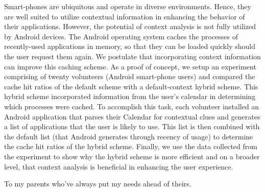 \documentclass[12pt]{uthesis-v12}  %
\begin{document}

\begin{abstractpage}
	Smart-phones are ubiquitous and operate in diverse environments. Hence, they are well suited to utilize contextual information in enhancing the behavior of their applications. However, the potential of context analysis is not fully utilized by Android devices. The Android operating system caches the processes of recently-used applications in memory, so that they can be loaded quickly should the user request them again. We postulate that incorporating context information can improve this caching scheme. As a proof of concept, we setup an experiment comprising of twenty volunteers (Android smart-phone users) and compared the cache hit ratios of the default scheme with a default-context hybrid scheme. This hybrid scheme incorporated information from the user's calendar in determining which processes were cached.  To accomplish this task, each volunteer installed an Android application that parses their Calendar for contextual clues and generates a list of applications that the user is likely to use. This list is then combined with the default list (that Android generates through recency of usage) to determine the cache hit ratios of the hybrid scheme. Finally, we use the data collected from the experiment to show why the hybrid scheme is more efficient and on a broader level, that context analysis is beneficial in enhancing the user experience.        
\end{abstractpage}


\begin{dedication}
\noindent To my parents who've always put my needs ahead of theirs.
\end{dedication}
\end{document}
